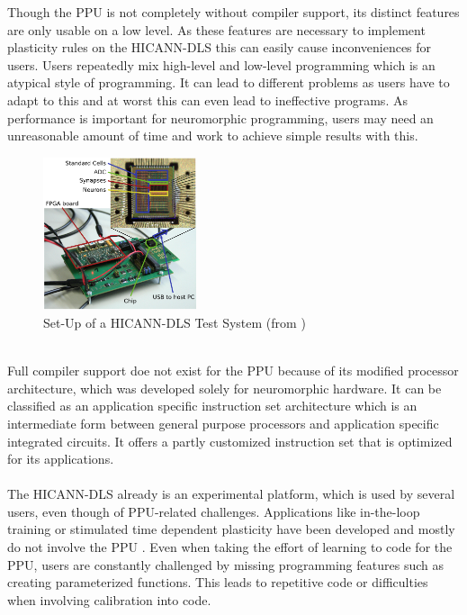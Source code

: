 Though the \ac{PPU} is not completely without compiler support, its distinct features are only usable on a low level.
As these features are necessary to implement plasticity rules on the \ac{HICANN-DLS} this can easily cause inconveniences for users.
Users repeatedly mix high-level and low-level programming which is an atypical style of programming.
It can lead to different problems as users have to adapt to this and at worst this can even lead to ineffective programs.
As performance is important for neuromorphic programming, users may need an unreasonable amount of time and work to achieve simple results with this.
\\
\begin{figure}
\captionsetup{format=plain, indention=.6cm, labelsep=newline,singlelinecheck=false}
    \centering
    \includegraphics[width=0.4\textwidth]{pictures/Fig1.png}
    \caption{\label{fig:dlsboard} Set-Up of a \ac{HICANN-DLS} Test System (from \citeauthor{PPU})}
\end{figure}
\\
Full compiler support doe not exist for the \ac{PPU} because of its modified processor architecture, which was developed solely for neuromorphic hardware.
It can be classified as an application specific instruction set architecture which is an intermediate form between general purpose processors and application specific integrated circuits.
It offers a partly customized instruction set that is optimized for its applications.
\\
\\
The \ac{HICANN-DLS} already is an experimental platform, which is used by several users, even though of \ac{PPU}-related challenges.
Applications like in-the-loop training or stimulated time dependent plasticity have been developed and mostly do not involve the \ac{PPU} .
Even when taking the effort of learning to code for the \ac{PPU}, users are constantly challenged by missing programming features such as creating parameterized functions.
This leads to repetitive code or difficulties when involving calibration into code.

